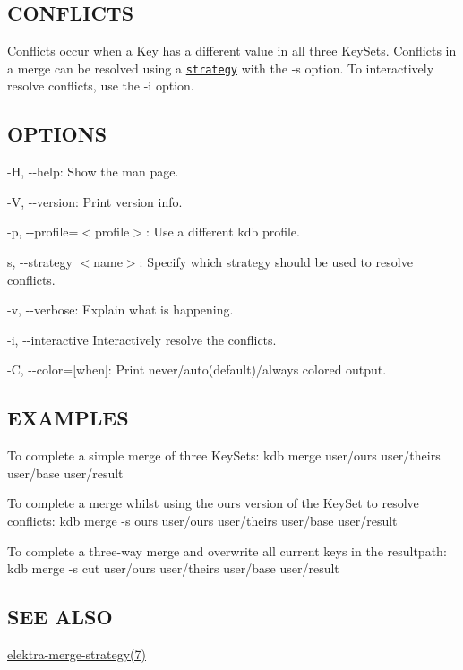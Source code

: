 \subsection*{C\+O\+N\+F\+L\+I\+C\+T\+S}

Conflicts occur when a Key has a different value in all three Key\+Sets. Conflicts in a merge can be resolved using a \href{#STRATEGIES}{\tt strategy} with the {\ttfamily -\/s} option. To interactively resolve conflicts, use the {\ttfamily -\/i} option.

\subsection*{O\+P\+T\+I\+O\+N\+S}


\begin{DoxyItemize}
\item {\ttfamily -\/\+H}, {\ttfamily -\/-\/help}\+: Show the man page.
\item {\ttfamily -\/\+V}, {\ttfamily -\/-\/version}\+: Print version info.
\item {\ttfamily -\/p}, {\ttfamily -\/-\/profile}=$<$profile$>$\+: Use a different kdb profile.
\item {\ttfamily s}, {\ttfamily -\/-\/strategy $<$name$>$}\+: Specify which strategy should be used to resolve conflicts.
\item {\ttfamily -\/v}, {\ttfamily -\/-\/verbose}\+: Explain what is happening.
\item {\ttfamily -\/i}, {\ttfamily -\/-\/interactive} Interactively resolve the conflicts.
\item {\ttfamily -\/\+C}, {\ttfamily -\/-\/color}=\mbox{[}when\mbox{]}\+: Print never/auto(default)/always colored output.
\end{DoxyItemize}

\subsection*{E\+X\+A\+M\+P\+L\+E\+S}

To complete a simple merge of three Key\+Sets\+: {\ttfamily kdb merge user/ours user/theirs user/base user/result}

To complete a merge whilst using the {\ttfamily ours} version of the Key\+Set to resolve conflicts\+: {\ttfamily kdb merge -\/s ours user/ours user/theirs user/base user/result}

To complete a three-\/way merge and overwrite all current keys in the {\ttfamily resultpath}\+: {\ttfamily kdb merge -\/s cut user/ours user/theirs user/base user/result}

\subsection*{S\+E\+E A\+L\+S\+O}


\begin{DoxyItemize}
\item \hyperlink{md_doc_help_elektra-merge-strategy_doc_help_elektra-merge-strategy_md}{elektra-\/merge-\/strategy(7)} 
\end{DoxyItemize}